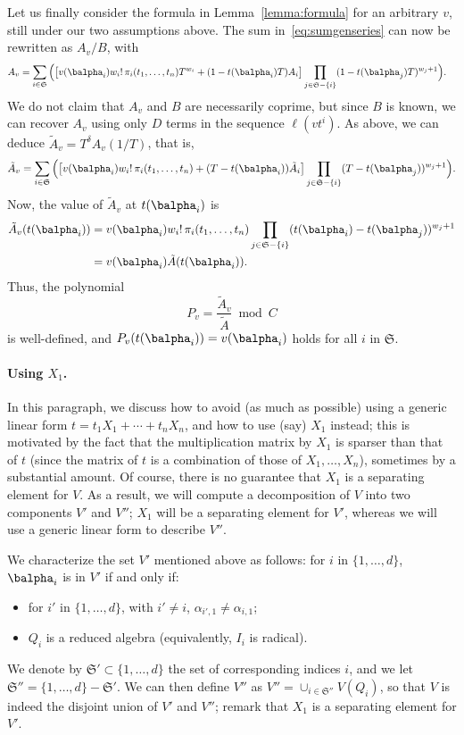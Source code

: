\documentclass[12pt]{article}
\begin{document}
Let us finally consider the formula in Lemma~\ref{lemma:formula} 
for an arbitrary $v$, still under our two assumptions above. 
The sum in~\eqref{eq:sumgenseries} can now be rewritten as $A_v/B$, with
\begin{align*}
  A_v&=\sum_{i \in \mathfrak{S}} \Big(\big[
 v(\balpha_i) w_i!\, \pi_{i}(t_1,\dots,t_n)
  T^{w_i} + (1-t(\balpha_i)    T)A_i\big]
\prod_{j \in \mathfrak{S}-\{i\}}(1-t(\balpha_j) T)^{w_{j}+1}\Big).
\end{align*}
We do not claim that $A_v$ and $B$ are necessarily coprime, but
since $B$ is known, we can recover $A_v$ using only $D$ 
terms in the sequence $\ell(v t^i)$. As above, we can deduce
$\tilde A_v
 = T^{\delta}A_v(1/T)$, that is,
$$\tilde A_v = 
\sum_{i \in \mathfrak{S}} \Big(\big[
 v(\balpha_i) w_i!\, \pi_{i}(t_1,\dots,t_n) + (T-t(\balpha_i)  )\tilde A_i\big]
\prod_{j \in \mathfrak{S}-\{i\}}(T-t(\balpha_j) )^{w_{j}+1}\Big).$$
Now, the value of $\tilde A_v$ at $t(\balpha_i)$ is 
\begin{align*}
\tilde A_v(t(\balpha_i))&=v(\balpha_i) w_i!\, \pi_{i}(t_1,\dots,t_n)\prod_{j \in
  \mathfrak{S}-\{i\}}(t(\balpha_i)-t(\balpha_j) )^{w_{j}+1}\\
&= v(\balpha_i) \tilde A(t(\balpha_i)).
\end{align*}
Thus, the polynomial 
$$P_v = \frac{\tilde A_v}{\tilde A} \bmod C$$
is well-defined, and $P_v(t(\balpha_i))=v(\balpha_i)$ holds for all $i$ in $\mathfrak{S}$.



\paragraph{Using $X_1$.}
In this paragraph, we discuss how to avoid (as much as possible) using
a generic linear form $t=t_1 X_1 + \cdots + t_n X_n$, and how to use
(say) $X_1$ instead; this is motivated by the fact that the
multiplication matrix by $X_1$ is sparser than that of $t$ (since the
matrix of $t$ is a combination of those of $X_1,\dots,X_n$), sometimes
by a substantial amount. Of course, there is no guarantee that $X_1$
is a separating element for $V$. As a result, we will compute a
decomposition of $V$ into two components $V'$ and $V''$; $X_1$
will be a separating element for $V'$, whereas we will use a generic
linear form to describe $V''$.

We characterize the set $V'$ mentioned above as follows: for $i$ in
$\{1,\dots,d\}$, $\balpha_i$ is in $V'$ if and only if:
\begin{itemize}
\item for $i'$ in $\{1,\dots,d\}$, with $i'\ne i$, $\alpha_{i',1} \ne \alpha_{i,1}$;
\item $Q_i$ is a reduced algebra (equivalently, $I_i$ is radical).
\end{itemize}
We denote by $\mathfrak{S}'\subset \{1,\dots,d\}$ the set of corresponding indices
$i$, and we let $\mathfrak{S}''=\{1,\dots,d\}-\mathfrak{S}'$. We can 
then define $V''$ as $V''=\cup_{i \in \mathfrak{S}''} V(Q_i)$, so that 
$V$ is indeed the disjoint union of $V'$ and $V''$; remark that $X_1$ is a
separating element for $V'$.
\end{document}
